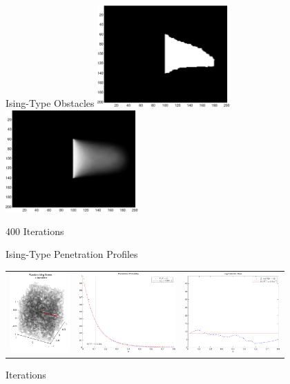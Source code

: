 \addtocounter{framenumber}{-1}
\begin{tframe}{Ising-Type Obstacles}
\includegraphics[width=2in]{media_exploration/ising400}
\includegraphics[width=2in]{media_exploration/marg400}

400 Iterations
\end{tframe}

\begin{tframe}{Ising-Type Penetration Profiles}

\bigskip
\begin{center}
\begin{tabular}{ccc}
\includegraphics[height=1.2in]{media_exploration/ising_cell_004}&
\includegraphics[height=1.2in]{media_exploration/ising_penetration_004}&
\includegraphics[height=1.2in]{media_exploration/ising_extinction_004}
\end{tabular}
 \end{center}

 Iterations
\end{tframe}


